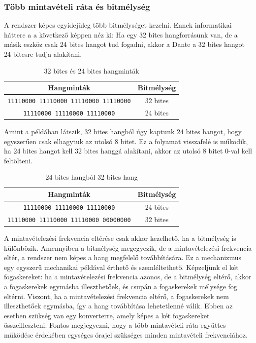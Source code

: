 \subsubsection{Több mintavételi ráta és bitmélység}
A rendszer képes egyidejűleg több bitmélységet kezelni. Ennek informatikai háttere a
a következő képpen néz ki:
Ha egy 32 bites hangforrásunk van, de a másik eszköz
csak 24 bites hangot tud fogadni, akkor a Dante a 32 bites hangot 24 bitesre tudja 
alakítani.
\begin{table}[h!]
	\centering
	\caption{32 bites és 24 bites hangminták}
	\begin{tabular}{|c|c|}
	\hline
	\textbf{Hangminták} & \textbf{Bitmélység} \\
	\hline
	\texttt{11110000 11110000 11110000 11110000} & 32 bites \\
	\hline
	\texttt{11110000 11110000 11110000} & 24 bites \\
	\hline
	\end{tabular}
	\label{tab:bit_depth_example}
\end{table}
Amint a példában látszik, 32 bites hangból úgy kaptunk 24 bites hangot, 
hogy egyszerűen csak elhagytuk az utolsó 8 bitet. Ez a folyamat visszafelé is működik,
ha 24 bites hangot kell 32 bites hanggá alakítani, akkor az utolsó 8 bitet 0-val kell feltölteni.
\begin{table}[h!]
	\centering
	\caption{24 bites hangból 32 bites hang}
	\begin{tabular}{|c|c|}
	\hline
	\textbf{Hangminták} & \textbf{Bitmélység} \\
	\hline
	\texttt{11110000 11110000 11110000} & 24 bites \\
	\hline
	\texttt{11110000 11110000 11110000 00000000} & 32 bites \\
	\hline
	\end{tabular}

	\label{tab:bit_depth_conversion}
\end{table}
A mintavételezési frekvencia eltérése csak akkor kezelhető, ha a bitmélység is különbözik. 
Amennyiben a bitmélység megegyezik, de a mintavételezési frekvencia eltér, a rendszer nem 
képes a hang megfelelő továbbítására. Ez a mechanizmus egy egyszerű mechanikai példával 
érthető és szemléltethető. Képzeljünk el két fogaskereket: ha a mintavételezési frekvencia 
azonos, de a bitmélység eltérő, akkor a fogaskerekek egymásba illeszthetőek, és csupán a 
fogaskerekek mélysége fog eltérni. Viszont, ha a mintavételezési frekvencia eltérő, a 
fogaskerekek nem illeszthetőek egymásba, így a hang továbbítása lehetetlenné válik. 
Ebben az esetben szükség van egy konverterre, amely képes a két fogaskereket összeilleszteni. 
Fontos megjegyezni, hogy a több mintavételi ráta együttes működése érdekében egységes 
órajel szükséges minden mintavételi frekvenciához.
